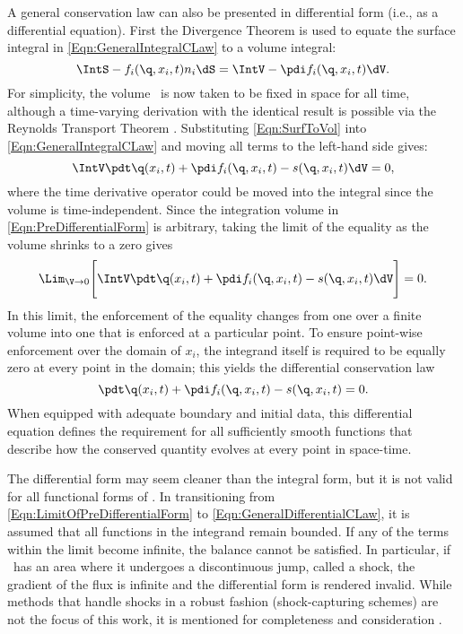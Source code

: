 A general conservation law can also be presented in differential form (i.e., as a differential equation).
First the Divergence Theorem is used to equate the surface integral in \cref{Eqn:GeneralIntegralCLaw} to a volume integral:
\begin{equation}
    \IntS -f_i(\q,x_i,t) n_i\dS = \IntV - \pdi f_i(\q,x_i,t) \dV.
    \label{Eqn:SurfToVol}
\end{equation}
For simplicity, the volume \V\ is now taken to be fixed in space for all time, although a time-varying derivation with the identical result is possible via the Reynolds Transport Theorem \cite{muralidhar_advanced_2005}.
Substituting \cref{Eqn:SurfToVol} into \cref{Eqn:GeneralIntegralCLaw} and moving all terms to the left-hand side gives:
\begin{equation}%
    \IntV \pdt\q(x_i,t) + \pdi f_i(\q,x_i,t) - s(\q,x_i,t) \dV = 0,
    \label{Eqn:PreDifferentialForm}
\end{equation}
where the time derivative operator could be moved into the integral since the volume is time-independent.
Since the integration volume in \cref{Eqn:PreDifferentialForm} is arbitrary, taking the limit of the equality as the volume shrinks to a zero gives
\begin{equation}%
    \Lim_{\V \rightarrow 0}\Biggl[\IntV \pdt\q(x_i,t) + \pdi f_i(\q,x_i,t) - s(\q,x_i,t) \dV \Biggr]= 0.
    \label{Eqn:LimitOfPreDifferentialForm}
\end{equation}
In this limit, the enforcement of the equality changes from one over a finite volume into one that is enforced at a particular point.
To ensure point-wise enforcement over the domain of $x_i$, the integrand itself is required to be equally zero at every point in the domain; this yields the differential conservation law
\begin{equation}
    \pdt\q(x_i,t) + \pdi f_i(\q,x_i,t) - s(\q,x_i,t) = 0.
    \label{Eqn:GeneralDifferentialCLaw}
\end{equation}
When equipped with adequate boundary and initial data, this differential equation defines the requirement for all sufficiently smooth functions that describe how the conserved quantity evolves at every point in space-time.

The differential form may seem cleaner than the integral form, but it is not valid for all functional forms of \q.
In transitioning from \cref{Eqn:LimitOfPreDifferentialForm} to \cref{Eqn:GeneralDifferentialCLaw}, it is assumed that all functions in the integrand remain bounded.
If any of the terms within the limit become infinite, the balance cannot be satisfied.
In particular, if \q\ has an area where it undergoes a discontinuous jump, called a shock, the gradient of the flux is infinite and the differential form is rendered invalid.
While methods that handle shocks in a robust fashion (shock-capturing schemes) are not the focus of this work, it is mentioned for completeness and consideration \cite{leveque_finite_2002-2}.

